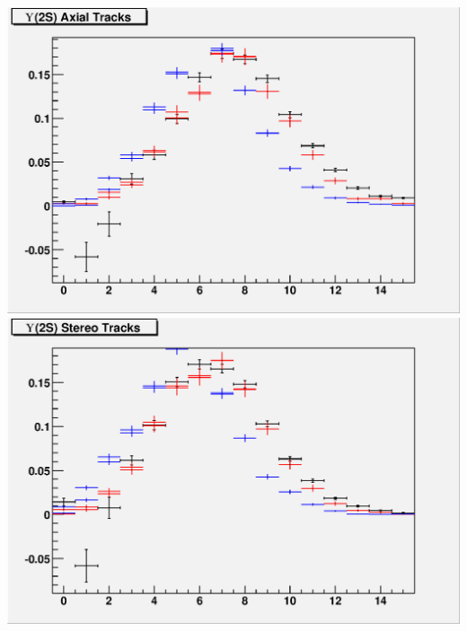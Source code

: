 \documentclass[12pt]{article}
\begin{document}
\includegraphics[width=\linewidth]{trigger2_trax.eps}
\vfill
\includegraphics[width=\linewidth]{trigger2_trst.eps}
\end{document}
